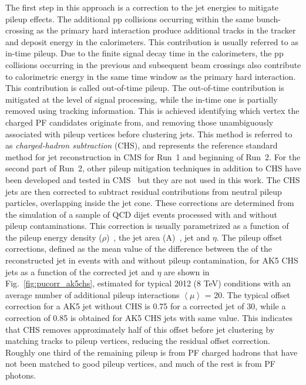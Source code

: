 The first step in this approach is a correction to the jet energies to mitigate pileup effects. The additional pp collisions occurring within the same bunch-crossing as the primary hard interaction produce additional tracks in the tracker and deposit energy in the calorimeters. This contribution is usually referred to as in-time pileup. Due to the finite signal decay time in the calorimeters, the pp collisions occurring in the previous and subsequent beam crossings also contribute to calorimetric energy in the same time window as the primary hard interaction. This contribution is called out-of-time pileup.
The out-of-time contribution is mitigated at the level of signal processing, while the in-time one is partially removed using tracking information. This is achieved identifying which vertex the charged PF candidates originate from, and removing those unambiguously associated with pileup vertices before clustering jets. This method is referred to as \textit{charged-hadron subtraction} (CHS), and represents the reference standard method for jet reconstruction in CMS for Run~1 and beginning of Run~2. For the second part of Run~2, other pileup mitigation techniques in addition to CHS have been developed and tested in CMS~\cite{CMS-PAS-JME-13-005,CMS-PAS-JME-14-001,JME-16-003} but they are not used in this work. 
The CHS jets are then corrected to subtract residual contributions from neutral pileup particles, overlapping inside the jet cone. These corrections are determined from the simulation of a sample of QCD dijet events processed with and without pileup contaminations. This correction is usually parametrized as a function of the pileup energy density ($\rho$)~\cite{Cacciari:2011ma,Cacciari:2005hq}, the jet area (A)~\cite{Cacciari:2007fd}, jet \pt and $\eta$. The pileup offset corrections, defined as the mean value of the difference between the \pt of the reconstructed jet in events with and without pileup contamination, for AK5 CHS jets as a function of the corrected jet \pt and $\eta$ are shown in Fig.~\ref{fig:pucorr_ak5chs}, estimated for typical 2012 (8 TeV) conditions with an average number of additional pileup interactions $\left\langle\mu\right\rangle$ = 20.
The typical offset correction for a AK5 jet without CHS is 0.75 for a corrected jet \pt of 30\GeV, while a correction of 0.85 is obtained for AK5 CHS jets with same \pt value. This indicates that CHS removes approximately half of this offset before jet clustering by matching tracks to pileup vertices, reducing the residual offset correction. Roughly one third of the remaining pileup is from PF charged hadrons that have not been matched to good pileup vertices, and much of the rest is from PF photons. 

